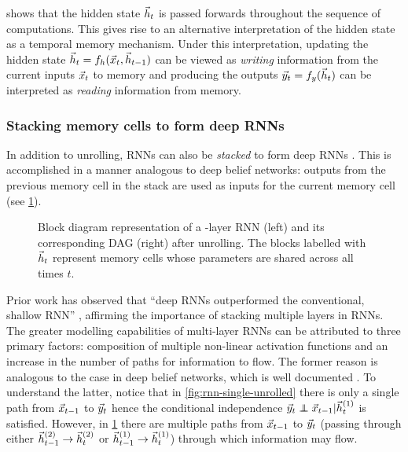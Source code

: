  shows that the hidden state $\vec{h}_t$ is passed
forwards throughout the sequence of computations. This gives rise to an
alternative interpretation of the hidden state as a temporal memory mechanism.
Under this interpretation, updating the hidden state $\vec{h}_t = f_h (\vec{x}_t,
\vec{h}_{t-1})$ can be viewed as \emph{writing} information from the current inputs
$\vec{x}_t$ to memory and producing the outputs $\vec{y}_t = f_y (\vec{h}_t)$ can be
interpreted as \emph{reading} information from memory.

\subsubsection{Stacking memory cells to form deep RNNs}

In addition to unrolling, RNNs can also be \emph{stacked} to form deep RNNs
\citep{el1995hierarchical,schmidhuber1992learning}. This is accomplished in a
manner analogous to deep belief networks: outputs from the previous memory cell
in the stack are used as inputs for the current memory cell (see
\cref{fig:rnn-multi-unrolled}).

\begin{figure}[tb]
    \centering
    \resizebox{4.5in}{!}{}
    \caption{Block diagram representation of a -layer RNN (left) and its
    corresponding DAG (right) after unrolling. The blocks labelled
    with $\vec{h}_t$ represent memory cells whose parameters are shared across all times
  $t$.}
    \label{fig:rnn-multi-unrolled}
\end{figure}

Prior work has observed that ``deep RNNs outperformed the conventional, shallow RNN''
\citet{pascanu2013construct}, affirming the importance of stacking multiple layers
in RNNs. The greater modelling capabilities of multi-layer RNNs can be
attributed to three primary factors: composition of multiple non-linear
activation functions and an increase in the number of paths for information to
flow. The former reason is analogous to the case in deep belief networks, which
is well documented \citep{bengio2009learning}. To understand the latter, notice
that in \cref{fig:rnn-single-unrolled} there is only a single path from
$\vec{x}_{t-1}$ to $\vec{y}_{t}$ hence the conditional independence $\y_{t} \independent
\x_{t-1} | \h^{(1)}_t$ is satisfied. However, in \cref{fig:rnn-multi-unrolled}
there are multiple paths from $\vec{x}_{t-1}$ to $\vec{y}_{t}$ (\eg passing through
either $\vec{h}^{(2)}_{t-1} \to \vec{h}^{(2)}_t$ or $\vec{h}^{(1)}_{t-1} \to \vec{h}^{(1)}_t$)
through which information may flow.

